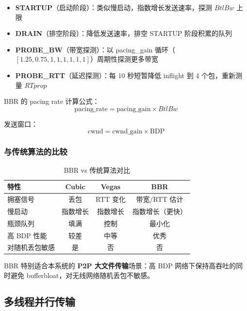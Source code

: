 \documentclass[12pt]{article}
\begin{document}
\begin{itemize}
    \item \textbf{STARTUP}（启动阶段）：类似慢启动，指数增长发送速率，探测 $BtlBw$ 上限
    \item \textbf{DRAIN}（排空阶段）：降低发送速率，排空 STARTUP 阶段积累的队列
    \item \textbf{PROBE\_BW}（带宽探测）：以 pacing\_gain 循环（$[1.25, 0.75, 1, 1, 1, 1, 1, 1]$）周期性探测更多带宽
    \item \textbf{PROBE\_RTT}（延迟探测）：每 10 秒短暂降低 inflight 到 4 个包，重新测量 $RTprop$
\end{itemize}

BBR 的 pacing rate 计算公式：
\begin{equation}
\text{pacing\_rate} = \text{pacing\_gain} \times BtlBw
\end{equation}

发送窗口：
\begin{equation}
\text{cwnd} = \text{cwnd\_gain} \times \text{BDP}
\end{equation}

\subsubsection{与传统算法的比较}

\begin{table}[H]
\centering
\caption{BBR vs 传统算法对比}
\begin{tabular}{lccc}
\toprule
\textbf{特性} & \textbf{Cubic} & \textbf{Vegas} & \textbf{BBR} \\
\midrule
拥塞信号 & 丢包 & RTT 变化 & 带宽/RTT 估计 \\
慢启动 & 指数增长 & 指数增长 & 指数增长（更快） \\
瓶颈队列 & 填满 & 控制 & 最小化 \\
高 BDP 性能 & 较差 & 中等 & 优秀 \\
对随机丢包敏感 & 是 & 否 & 否 \\
\bottomrule
\end{tabular}
\end{table}

BBR 特别适合本系统的 \textbf{P2P 大文件传输}场景：高 BDP 网络下保持高吞吐的同时避免 bufferbloat，对无线网络随机丢包不敏感。

\subsection{多线程并行传输}
\end{document}
